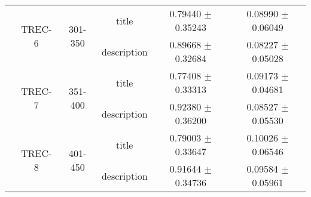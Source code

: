 \begin{table*}
\begin{tabular}{| c || c | c | c || c | c |}
    \cline{2-6}
    &   \multirow{2}{*}{TREC-6}
        &   \multirow{2}{*}{301-350}
            &   title %
                &   0.79440 $\pm$ 0.35243 & 0.08990 $\pm$ 0.06049\\
    &   &   &   description %
                &   0.89668 $\pm$ 0.32684 & 0.08227 $\pm$ 0.05028\\
    \cline{2-6}
    &   \multirow{2}{*}{TREC-7}
        &   \multirow{2}{*}{351-400}
            &   title %
                &   0.77408 $\pm$ 0.33313 & 0.09173 $\pm$ 0.04681\\
    &   &   &   description %
                &   0.92380 $\pm$ 0.36200 & 0.08527 $\pm$ 0.05530\\
    \cline{2-6}
    &   \multirow{2}{*}{TREC-8}
        &   \multirow{2}{*}{401-450}
            &   title %
                &   0.79003 $\pm$ 0.33647 & 0.10026 $\pm$ 0.06546\\
    &   &   &   description %
                &   0.91644 $\pm$ 0.34736 & 0.09584 $\pm$ 0.05961\\


\end{tabular}
\end{table*}
